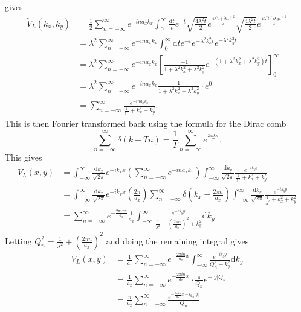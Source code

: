 \documentclass{article}
\numberwithin{equation}{section}
\begin{document}
gives
\begin{align*}
    \tilde{V}_L(k_x, k_y) &= \frac{1}{2}\sum_{n=-\infty}^\infty e^{-ina_xk_x} \int_0^\infty\frac{\mathrm{d}t}{t}e^{-t} \sqrt{\frac{4\lambda^2t}{2}}e^{\frac{4\lambda^2t(ik_x)^2}{4}} \sqrt{\frac{4\lambda^2t}{2}}e^{\frac{4\lambda^2t(ikyx)^2}{4}} \\
    &= \lambda^2\sum_{n=-\infty}^\infty e^{-ina_xk_x} \int_0^\infty\mathrm{d}te^{-t}e^{-\lambda^2k_x^2t}e^{-\lambda^2k_y^2t} \\
    &= \lambda^2\sum_{n=-\infty}^\infty e^{-ina_xk_x} \left[\frac{-1}{1+\lambda^2k_x^2+\lambda^2k_y^2} e^{-\left(1+\lambda^2k_x^2+\lambda^2k_y^2\right)t}\right]_0^\infty\ \\
    &= \lambda^2\sum_{n=-\infty}^\infty e^{-ina_xk_x} \frac{1}{1+\lambda^2k_x^2+\lambda^2k_y^2} \cdot e^0 \\
    &= \sum_{n=-\infty}^\infty \frac{e^{-ina_xk_x}}{\frac{1}{\lambda^2}+k_x^2+k_y^2}.
\end{align*}
This is then Fourier transformed back using the formula for the Dirac comb
\begin{equation}
    \sum_{n=-\infty}^\infty\delta(k-Tn) = \frac{1}{T}\sum_{n=-\infty}^\infty e^{\frac{2\pi ikn}{T}}.
\end{equation}
This gives
\begin{align*}
    V_L(x, y) &= \int_{-\infty}^\infty\frac{\mathrm{d}k_x}{\sqrt{2\pi}}e^{-ik_xx} \left(\sum_{n=-\infty}^\infty e^{-ina_xk_x}\right) \int_{-\infty}^\infty\frac{\mathrm{d}k_y}{\sqrt{2\pi}} \frac{e^{-ik_yy}}{\frac{1}{\lambda^2}+k_x^2+k_y^2} \\
    &= \int_{-\infty}^\infty\frac{\mathrm{d}k_x}{\sqrt{2\pi}}e^{-ik_xx} \left(\frac{2\pi}{a_x}\right)\sum_{n=-\infty}^\infty
    \delta\left(k_x - \frac{2\pi n}{a_x}\right) \int_{-\infty}^\infty\frac{\mathrm{d}k_y}{\sqrt{2\pi}} \frac{e^{-ik_yy}}{\frac{1}{\lambda^2}+k_x^2+k_y^2} \\
     &= \sum_{n=-\infty}^\infty e^{-\frac{2\pi ixn}{a_x}}\frac{1}{a_x} \int_{-\infty}^\infty\frac{e^{-ik_yy}} {\frac{1}{\lambda^2}+\left(\frac{2\pi n}{a_x}\right)^2+k_y^2}\mathrm{d}k_y.
\end{align*}
Letting $Q_n^2 = \frac{1}{\lambda^2} + \left(\frac{2\pi n}{a_x}\right)^2$ and doing the remaining integral gives
\begin{align}
    V_L(x, y) &= \frac{1}{a_x}\sum_{n=-\infty}^\infty e^{-\frac{2\pi in}{a_x}x} \int_{-\infty}^\infty\frac{e^{-ik_yy}} {Q_n^2+k_y^2}\mathrm{d}k_y \nonumber \\
    &= \frac{1}{a_x}\sum_{n=-\infty}^\infty e^{-\frac{2\pi in}{a_x}x}\cdot \frac{\pi}{Q_n}e^{-|y|Q_n} \nonumber \\
    &= \frac{\pi}{a_x}\sum_{n=-\infty}^\infty \frac{e^{-\frac{2\pi in}{a_x}x-Q_n|y|}}{Q_n}.
\end{align}
\end{document}

